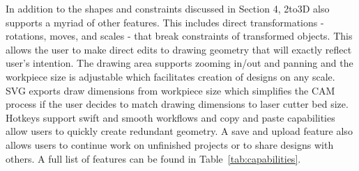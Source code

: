 In addition to the shapes and constraints discussed in Section 4, 2to3D also supports a myriad of other features. This includes direct transformations - rotations, moves, and scales - that break constraints of transformed objects. This allows the user to make direct edits to drawing geometry that will exactly reflect user's intention. The drawing area supports zooming in/out and panning and the workpiece size is adjustable which facilitates creation of designs on any scale. SVG exports draw dimensions from workpiece size which simplifies the CAM process if the user decides to match drawing dimensions to laser cutter bed size. Hotkeys support swift and smooth workflows and copy and paste capabilities allow users to quickly create redundant geometry. A save and upload feature also allows users to continue work on unfinished projects or to share designs with others. A full list of features can be found in Table~\ref{tab:capabilities}.

